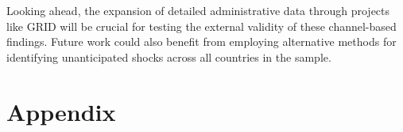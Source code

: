 \documentclass[12pt, a4paper]{article}
\begin{document}
Looking ahead, the expansion of detailed administrative data through projects like GRID will be crucial for testing the external validity of these channel-based findings. Future work could also benefit from employing alternative methods for identifying unanticipated shocks across all countries in the sample.

\newpage
\printbibliography
\pagebreak
\section*{Appendix}
\renewcommand{\thetable}{A\arabic{table}}
\renewcommand{\thefigure}{B\arabic{figure}}
\setcounter{figure}{0}
\setcounter{table}{0}
\end{document}
